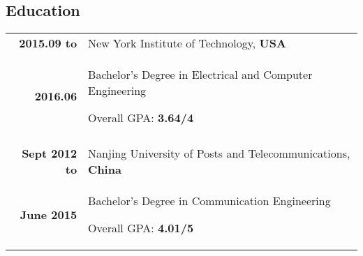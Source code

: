 \documentclass[a4paper, 10pt]{extarticle} %
\begin{document}
\begin{CJK*}{GBK}{song}
\section{Education}

\begin{longtable}{r | p{15cm}}	


\textbf{2015.09 to}
		
		 &
		
		 New York Institute of Technology, \textbf{USA}  \\
		
			\textbf{2016.06}
		
		&

\footnotesize{

\vspace{-0.3cm}
\small{Bachelor’s Degree in Electrical and Computer Engineering

Overall GPA: \textbf{3.64/4}}

%
%
%
}\\
\multicolumn{2}{c}{}
\\
\textbf{Sept 2012 to}
		
		 &
		
		 Nanjing University of Posts and Telecommunications, \textbf{China}  \\
		
			\textbf{June 2015}
		
		&
	
\footnotesize{

\vspace{-0.3cm}

\small{Bachelor’s Degree in Communication Engineering

Overall GPA: \textbf{4.01/5}}
%
%
%
%
%
}
\end{longtable}


\end{CJK*}
\end{document}

